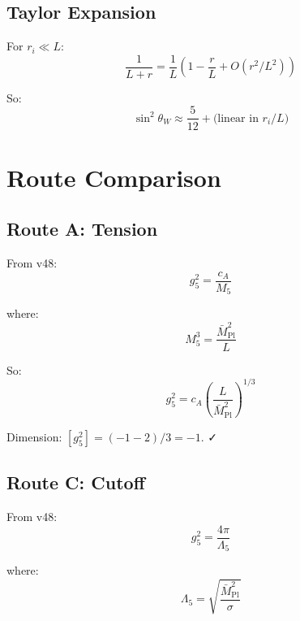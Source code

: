 \documentclass[11pt,a4paper]{article}
\begin{document}
\subsection{Taylor Expansion}
\label{app:bkt-taylor}

For $r_i \ll L$:
\begin{equation}
\label{eq:L-eff-expand}
\frac{1}{L + r} = \frac{1}{L}\left(1 - \frac{r}{L} + O(r^2/L^2)\right)
\end{equation}

So:
\begin{equation}
\label{eq:sin2-expand}
\sin^2\theta_W \approx \frac{5}{12} + \text{(linear in } r_i/L \text{)}
\end{equation}

\section{Route Comparison}
\label{app:routes}

\subsection{Route A: Tension}
\label{app:route-a}

From v48:
\begin{equation}
\label{eq:route-a-g5}
g_5^2 = \frac{c_A}{M_5}
\end{equation}

where:
\begin{equation}
\label{eq:M5-def}
M_5^3 = \frac{\bar{M}_{\text{Pl}}^2}{L}
\end{equation}

So:
\begin{equation}
\label{eq:route-a-explicit}
g_5^2 = c_A \left(\frac{L}{\bar{M}_{\text{Pl}}^2}\right)^{1/3}
\end{equation}

Dimension: $[g_5^2] = (-1 - 2)/3 = -1$. ✓

\subsection{Route C: Cutoff}
\label{app:route-c}

From v48:
\begin{equation}
\label{eq:route-c-g5}
g_5^2 = \frac{4\pi}{\Lambda_5}
\end{equation}

where:
\begin{equation}
\label{eq:Lambda5-def}
\Lambda_5 = \sqrt{\frac{\bar{M}_{\text{Pl}}^2}{\sigma}}
\end{equation}
\end{document}
